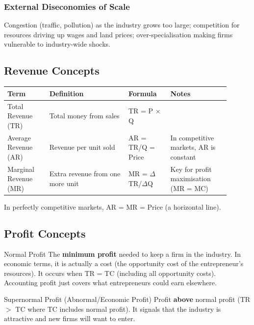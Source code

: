 \documentclass[11pt, a4paper, twoside]{book}
\begin{document}
\subsubsection{External Diseconomies of Scale}

Congestion (traffic, pollution) as the industry grows too large; competition for resources driving up wages and land prices; over-specialisation making firms vulnerable to industry-wide shocks.

\subsection{Revenue Concepts}

\begin{example}
\begin{tabular}{@{}>{\RaggedRight\arraybackslash}p{0.17\linewidth}>{\RaggedRight\arraybackslash}p{0.32\linewidth}>{\RaggedRight\arraybackslash}p{0.17\linewidth}>{\RaggedRight\arraybackslash}p{0.24\linewidth}@{}}
\textbf{Term} & \textbf{Definition} & \textbf{Formula} & \textbf{Notes} \\
\midrule
Total Revenue (TR) & Total money from sales & TR = P $\times$ Q & \\
Average Revenue (AR) & Revenue per unit sold & AR = TR/Q = Price & In competitive markets, AR is constant \\
Marginal Revenue (MR) & Extra revenue from one more unit & MR = $\Delta$TR/$\Delta$Q & Key for profit maximisation (MR = MC) \\
\end{tabular}
\end{example}

In perfectly competitive markets, AR = MR = Price (a horizontal line).

\subsection{Profit Concepts}

\begin{keyterm}{Normal Profit}
The \textbf{minimum profit} needed to keep a firm in the industry. In economic terms, it is actually a cost (the opportunity cost of the entrepreneur's resources). It occurs when TR = TC (including all opportunity costs). Accounting profit just covers what entrepreneurs could earn elsewhere.
\end{keyterm}

\begin{keyterm}{Supernormal Profit (Abnormal/Economic Profit)}
Profit \textbf{above} normal profit (TR $>$ TC where TC includes normal profit). It signals that the industry is attractive and new firms will want to enter.
\end{keyterm}
\end{document}
